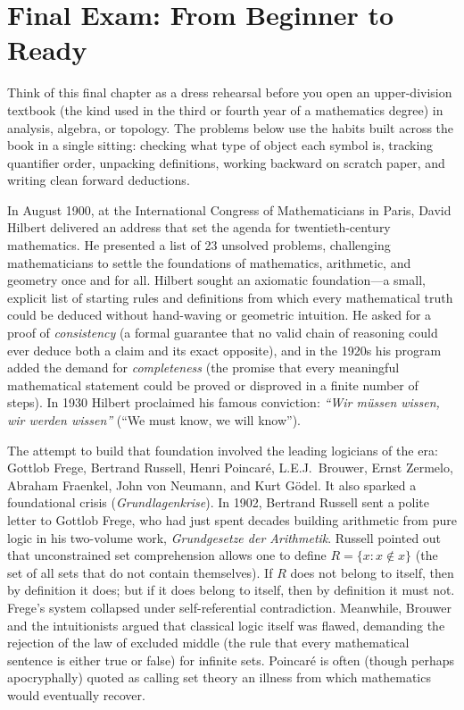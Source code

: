 \section{Final Exam: From Beginner to Ready}
\chapterline

Think of this final chapter as a dress rehearsal before you open an upper-division textbook (the kind used in the third or fourth year of a mathematics degree) in analysis, algebra, or topology. The problems below use the habits built across the book in a single sitting: checking what type of object each symbol is, tracking quantifier order, unpacking definitions, working backward on scratch paper, and writing clean forward deductions.

\begin{historybox}
In August 1900, at the International Congress of Mathematicians in Paris, David Hilbert delivered an address that set the agenda for twentieth-century mathematics. He presented a list of 23 unsolved problems, challenging mathematicians to settle the foundations of mathematics, arithmetic, and geometry once and for all. Hilbert sought an axiomatic foundation---a small, explicit list of starting rules and definitions from which every mathematical truth could be deduced without hand-waving or geometric intuition. He asked for a proof of \emph{consistency} (a formal guarantee that no valid chain of reasoning could ever deduce both a claim and its exact opposite), and in the 1920s his program added the demand for \emph{completeness} (the promise that every meaningful mathematical statement could be proved or disproved in a finite number of steps). In 1930 Hilbert proclaimed his famous conviction: \emph{``Wir m\"ussen wissen, wir werden wissen''} (``We must know, we will know'').

The attempt to build that foundation involved the leading logicians of the era: Gottlob Frege, Bertrand Russell, Henri Poincar\'e, L.E.J.~Brouwer, Ernst Zermelo, Abraham Fraenkel, John von Neumann, and Kurt G\"odel. It also sparked a foundational crisis (\emph{Grundlagenkrise}). In 1902, Bertrand Russell sent a polite letter to Gottlob Frege, who had just spent decades building arithmetic from pure logic in his two-volume work, \emph{Grundgesetze der Arithmetik}. Russell pointed out that unconstrained set comprehension allows one to define $R = \{x : x \notin x\}$ (the set of all sets that do not contain themselves). If $R$ does not belong to itself, then by definition it does; but if it does belong to itself, then by definition it must not. Frege's system collapsed under self-referential contradiction. Meanwhile, Brouwer and the intuitionists argued that classical logic itself was flawed, demanding the rejection of the law of excluded middle (the rule that every mathematical sentence is either true or false) for infinite sets. Poincar\'e is often (though perhaps apocryphally) quoted as calling set theory an illness from which mathematics would eventually recover.


\end{historybox}
